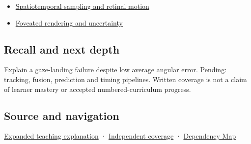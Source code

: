 \begin{itemize}
\tightlist
\item
  \hyperref[appendix-70895739febb]{Spatiotemporal sampling and retinal motion}
\item
  \hyperref[appendix-5878b813b732]{Foveated rendering and uncertainty}
\end{itemize}

\subsection{Recall and next depth}\label{appendix-a6f2c4fe1996-recall-and-next-depth}

\hypertarget{appendix-a6f2c4fe1996-recall-and-next-depth}{}

Explain a gaze-landing failure despite low average angular error. Pending: tracking, fusion, prediction and timing pipelines. Written coverage is not a claim of learner mastery or accepted numbered-curriculum progress.

\subsection{Source and navigation}\label{appendix-a6f2c4fe1996-source-and-navigation}

\hypertarget{appendix-a6f2c4fe1996-source-and-navigation}{}

\hyperref[04-visual-computing-ii-ch042-a-gaze-sample-needs-a-time-as-well-as-a-direction]{Expanded teaching explanation} · \hyperref[appendix-fd090d982a15-xr01---independent-seeing-and-representation-source]{Independent coverage} · \hyperref[appendix-4ad47bdd269a]{Dependency Map}
